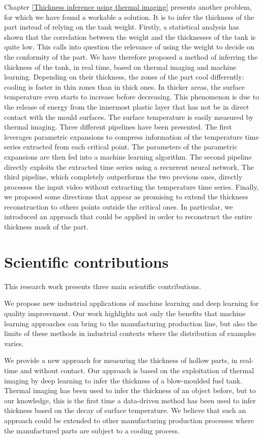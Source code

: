 Chapter \ref{Thickness inference using thermal imaging} presents another problem, for which we have found a workable a solution. It is to infer the thickness of the part instead of relying on the tank weight. Firstly, a statistical analysis has shown that the correlation between the weight and the thicknesses of the tank is quite low. This calls into question the relevance of using the weight to decide on the conformity of the part. We have therefore proposed a method of inferring the thickness of the tank, in real time, based on thermal imaging and machine learning. Depending on their thickness, the zones of the part cool differently: cooling is faster in thin zones than in thick ones. In thicker areas, the surface temperature even starts to increase before decreasing. This phenomenon is due to the release of energy from the innermost plastic layer that has not be in direct contact with the mould surfaces. The surface temperature is easily measured by thermal imaging. Three different pipelines have been presented. The first leverages parametric expansions to compress information of the temperature time series extracted from each critical point. The parameters of the parametric expansions are then fed into a machine learning algorithm. The second pipeline directly exploits the extracted time series using a recurrent neural network. The third pipeline, which completely outperforms the two previous ones, directly processes the input video without extracting the temperature time series. Finally, we proposed some directions that appear as promising to extend the thickness reconstruction to others points outside the critical ones. In particular, we introduced an approach that could be applied in order to reconstruct the entire thickness mask of the part.


\section*{Scientific contributions}

This research work presents three main scientific contributions.

We propose new industrial applications of machine learning and deep learning for quality improvement. Our work highlights not only the benefits that machine learning approaches can bring to the manufacturing production line, but also the limits of these methods in industrial contexts where the distribution of examples varies. 

We provide a new approach for measuring the thickness of hollow parts, in real-time and without contact. Our approach is based on the exploitation of thermal imaging by deep learning to infer the thickness of a blow-moulded fuel tank. Thermal imaging has been used to infer the thickness of an object before, but to our knowledge, this is the first time a data-driven method has been used to infer thickness based on the decay of surface temperature. We believe that such an approach could be extended to other manufacturing production processes where the manufactured parts are subject to a cooling process.    

